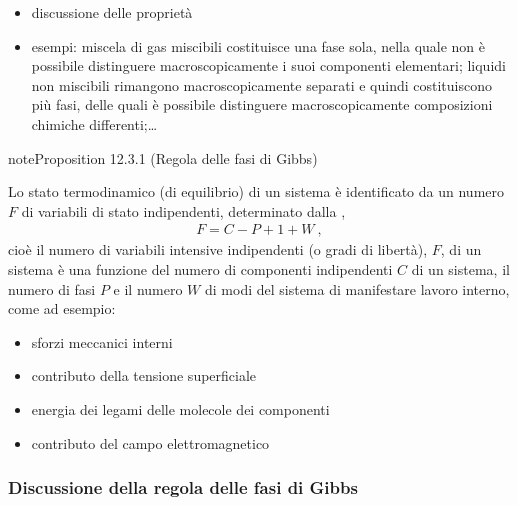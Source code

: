 \documentclass[letterpaper,10pt,italian]{jupyterBook}
\begin{document}
\sphinxAtStartPar
{}
\begin{itemize}
\item {} 
\sphinxAtStartPar
discussione delle proprietà

\item {} 
\sphinxAtStartPar
esempi: miscela di gas miscibili costituisce una fase sola, nella quale non è possibile distinguere macroscopicamente i suoi componenti elementari; liquidi non miscibili rimangono macroscopicamente separati e quindi costituiscono più fasi, delle quali è possibile distinguere macroscopicamente composizioni chimiche differenti;…

\end{itemize}
\label{ch/thermodynamics/principles-gibbs-phase-rule:proposition-4}
\begin{sphinxadmonition}{note}{Proposition 12.3.1 (Regola delle fasi di Gibbs)}



\sphinxAtStartPar
Lo stato termodinamico (di equilibrio) di un sistema è identificato da un numero \(F\) di variabili di stato  indipendenti, determinato dalla ,
\begin{equation*}
\begin{split}F = C - P + 1 + W \ ,\end{split}
\end{equation*}
\sphinxAtStartPar
cioè il numero di variabili intensive indipendenti (o gradi di libertà), \(F\), di un sistema è una funzione del numero di componenti indipendenti \(C\) di un sistema, il numero di fasi \(P\) e il numero \(W\) di modi del sistema di manifestare lavoro interno, come ad esempio:
\begin{itemize}
\item {} 
\sphinxAtStartPar
sforzi meccanici interni

\item {} 
\sphinxAtStartPar
contributo della tensione superficiale

\item {} 
\sphinxAtStartPar
energia dei legami delle molecole dei componenti

\item {} 
\sphinxAtStartPar
contributo del campo elettromagnetico

\end{itemize}
\end{sphinxadmonition}
\subsubsection*{Discussione della regola delle fasi di Gibbs}
\end{document}
